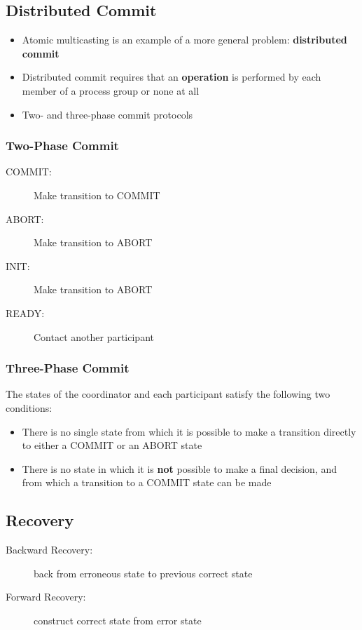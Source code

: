 \begin{multicols}{2}

\subsection{Distributed Commit}
\begin{itemize}
	\item Atomic multicasting is an example of a more general problem: \textbf{distributed commit}
	\item Distributed commit requires that an \textbf{operation} is performed by each member of a process group or none at all
	\item Two- and three-phase commit protocols	
\end{itemize}

\subsubsection{Two-Phase Commit}
\begin{description}
	\item[COMMIT:] Make transition to COMMIT
	\item[ABORT:] Make transition to ABORT
	\item[INIT:] Make transition to ABORT
	\item[READY:] Contact another participant
\end{description}
	
\subsubsection{Three-Phase Commit}
The states of the coordinator and each participant satisfy the following two conditions:
\begin{itemize}
	\item There is no single state from which it is possible to make a transition directly to either a COMMIT or an ABORT state
	\item There is no state in which it is \textbf{not} possible to make a final decision, and from which a transition to a COMMIT state can be made	
\end{itemize}

\subsection{Recovery}
\begin{description}
	\item[Backward Recovery:] back from erroneous state to previous correct state
	\item[Forward Recovery:] construct correct state from error state
\end{description}


\end{multicols}

